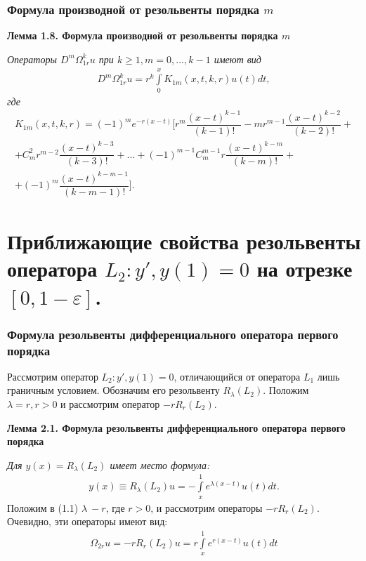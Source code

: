 \documentclass[10pt,utf8,presentation,notheorems]{beamer}
\theoremstyle{plain}
\theoremstyle{definition}
\begin{document}
\begin{frame}
\frametitle{Формула производной от резольвенты порядка $ m $}

\label{lemma1.8}
\textbf{Лемма 1.8. Формула производной от резольвенты порядка $ m $}

\textit{Операторы $ D^m\Omega_{1r}^ku $ при $ k \geq 1, m = 0,...,k-1 $ имеют вид}
\begin{equation}
\begin{array}{c}
D^m\Omega_{1r}^ku = r^k\int\limits_0^x K_{1m}(x,t,k,r)u(t)dt,
\end{array}
\end{equation}
\textit{где}
\begin{equation}
\begin{array}{c}
K_{1m}(x,t,k,r) = (-1)^me^{-r(x-t)} \biggl[r^m\dfrac{(x-t)^{k-1}}{(k-1)!} - mr^{m-1}\dfrac{(x-t)^{k-2}}{(k-2)!} + \\ + C_m^2r^{m-2}\dfrac{(x-t)^{k-3}}{(k-3)!} + ... + (-1)^{m-1}C_m^{m-1}r\dfrac{(x-t)^{k-m}}{(k-m)!} + \\ 
+ (-1)^m\dfrac{(x-t)^{k-m-1}}{(k-m-1)!}\biggr].
\end{array}
\end{equation}
\end{frame}

\section{Приближающие свойства резольвенты оператора $ L_2:y', y(1)=0 $ на отрезке $ [0, 1 - \varepsilon ] $.}

\begin{frame}
\frametitle{Формула резольвенты дифференциального оператора первого порядка}
Рассмотрим оператор $ L_2: y', y(1) = 0 $, отличающийся от оператора $ L_1 $ лишь граничным условием.
Обозначим его резольвенту $R_\lambda(L_2)$. Положим $ \lambda = r, r > 0 $ и рассмотрим оператор $ -rR_r(L_2) $.

\label{lemma2.1}
\textbf{Лемма 2.1. Формула резольвенты дифференциального оператора первого порядка}

\textit{Для $ y(x) = R_\lambda(L_2) $ имеет место формула:}
\begin{equation}
\begin{array}{c}
y(x) \equiv R_\lambda(L_2)u = -\int\limits_x^1 e^{\lambda (x-t)}u(t)dt.
\end{array}
\end{equation}
Положим в (1.1) $ \lambda \ -r $, где $ r > 0 $, и рассмотрим операторы $ -rR_{r}(L_2)$. Очевидно, эти операторы имеют вид:
\begin{equation}
\begin{array}{c}
\Omega_{2r}u = -rR_{r}(L_2)u = r \int\limits_x^1 e^{r(x-t)}u(t)dt
\end{array}
\end{equation}
\end{frame}
\end{document}
